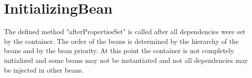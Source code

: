 \section{InitializingBean}
\label{feature:InitializingBean}
\ClearAPI
The defined method "afterPropertiesSet" is called after all dependencies were set by the container. The order of the beans is determined by the hierarchy of the beans and by the bean priority. At this point the container is not completely initialized and some beans may not be instantiated and not all dependencies may be injected in other beans.